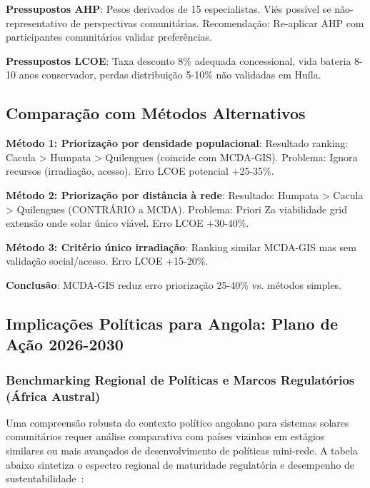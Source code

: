 \documentclass[12pt, a4paper]{article}
\begin{document}
\textbf{Pressupostos AHP}: Pesos derivados de 15 especialistas. Viés possível se não-representativo de perspectivas comunitárias. Recomendação: Re-aplicar AHP com participantes comunitários validar preferências.

\textbf{Pressupostos LCOE}: Taxa desconto 8\% adequada concessional, vida bateria 8-10 anos conservador, perdas distribuição 5-10\% não validadas em Huíla.

\subsection{Comparação com Métodos Alternativos}

\textbf{Método 1: Priorização por densidade populacional}: Resultado ranking: Cacula > Humpata > Quilengues (coincide com MCDA-GIS). Problema: Ignora recursos (irradiação, acesso). Erro LCOE potencial +25-35\%.

\textbf{Método 2: Priorização por distância à rede}: Resultado: Humpata > Cacula > Quilengues (CONTRÁRIO a MCDA). Problema: Priori Za viabilidade grid extensão onde solar único viável. Erro LCOE +30-40\%.

\textbf{Método 3: Critério único irradiação}: Ranking similar MCDA-GIS mas sem validação social/acesso. Erro LCOE +15-20\%.

\textbf{Conclusão}: MCDA-GIS reduz erro priorização 25-40\% vs. métodos simples.

\subsection{Implicações Políticas para Angola: Plano de Ação 2026-2030}

\subsubsection{Benchmarking Regional de Políticas e Marcos Regulatórios (África Austral)}

Uma compreensão robusta do contexto político angolano para sistemas solares comunitários requer análise comparativa com países vizinhos em estágios similares ou mais avançados de desenvolvimento de políticas mini-rede. A tabela abaixo sintetiza o espectro regional de maturidade regulatória e desempenho de sustentabilidade~\citep{Chirwa2024}:
\end{document}
